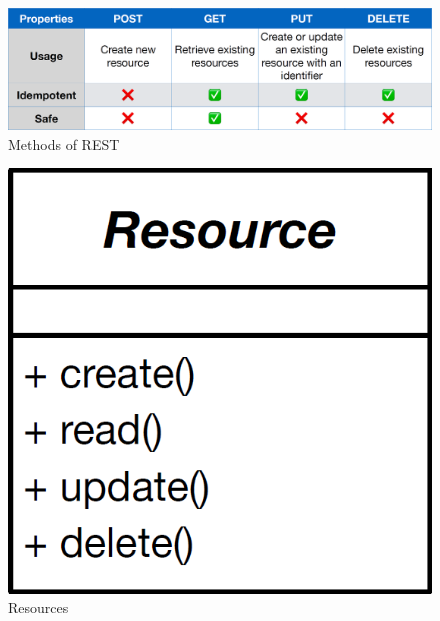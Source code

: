 \begin{figure}[H]
  \centering
  \includegraphics[width=.85\linewidth]{images/pattern_rest_methods.png}
  \caption{Methods of REST}
\end{figure}

\begin{figure}[h]
\centering
\begin{minipage}[t]{0.3\linewidth}
\centering
\includegraphics[width=1\textwidth]{images/pattern_rest_resource.png}
\caption{Resources}
\end{minipage}
\hfill
\begin{minipage}[t]{0.3\linewidth}
\centering

\end{minipage}
\end{figure}
